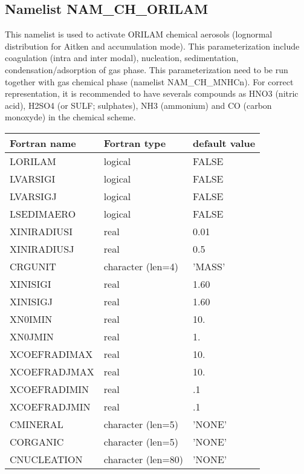 
\subsection{Namelist NAM\_CH\_ORILAM }
 
This namelist is used to activate ORILAM chemical aerosols (lognormal distribution for Aitken and accumulation mode).
This parameterization include coagulation (intra and inter modal), nucleation,  sedimentation, condensation/adsorption of gas phase.
 This parameterization need to be run together with gas chemical phase (namelist NAM\_CH\_MNHCn). 
For correct representation, it is recommended to have severals compounds as HNO3 (nitric acid), H2SO4 (or SULF; sulphates), NH3 (ammonium) and CO (carbon monoxyde) in the chemical scheme. 

\begin{longtable} {|p{}|p{}|p{}|}
\hline
Fortran name &  Fortran type & default value \\
\hline 
\endhead
\hline
\endfoot
LORILAM     & logical  & FALSE  \\
LVARSIGI    & logical  & FALSE  \\
LVARSIGJ    & logical  & FALSE  \\
LSEDIMAERO  & logical  & FALSE  \\
XINIRADIUSI & real     & 0.01  \\
XINIRADIUSJ & real     & 0.5  \\
CRGUNIT     & character (len=4)  & 'MASS'   \\
XINISIGI    & real     & 1.60  \\
XINISIGJ    & real     & 1.60  \\
XN0IMIN     & real     &  10.  \\
XN0JMIN     & real     &  1.   \\
XCOEFRADIMAX& real     &  10.  \\
XCOEFRADJMAX& real     &  10.  \\
XCOEFRADIMIN& real     &  .1  \\
XCOEFRADJMIN& real     &  .1  \\
CMINERAL    & character (len=5)  & 'NONE'   \\
CORGANIC    & character (len=5)  & 'NONE'   \\
CNUCLEATION & character (len=80) & 'NONE'   \\
\end{longtable}

